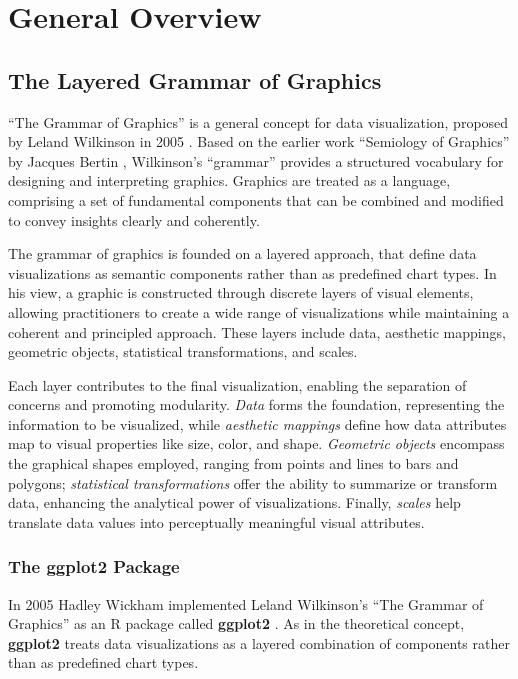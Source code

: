 \documentclass[
]{krantz}
\begin{document}
\hypertarget{part-general-overview}{%
\part{General Overview}\label{part-general-overview}}

\hypertarget{grammar}{%
\chapter{The Layered Grammar of Graphics}\label{grammar}}

``The Grammar of Graphics'' is a general concept for data visualization, proposed by Leland Wilkinson in 2005 \citep{wilkinson2005}. Based on the earlier work ``Semiology of Graphics'' by Jacques Bertin \citep{bertin1983}, Wilkinson's ``grammar'' provides a structured vocabulary for designing and interpreting graphics. Graphics are treated as a language, comprising a set of fundamental components that can be combined and modified to convey insights clearly and coherently.

The grammar of graphics is founded on a layered approach, that define data visualizations as semantic components rather than as predefined chart types. In his view, a graphic is constructed through discrete layers of visual elements, allowing practitioners to create a wide range of visualizations while maintaining a coherent and principled approach. These layers include data, aesthetic mappings, geometric objects, statistical transformations, and scales.

Each layer contributes to the final visualization, enabling the separation of concerns and promoting modularity. \emph{Data} forms the foundation, representing the information to be visualized, while \emph{aesthetic mappings} define how data attributes map to visual properties like size, color, and shape. \emph{Geometric objects} encompass the graphical shapes employed, ranging from points and lines to bars and polygons; \emph{statistical transformations} offer the ability to summarize or transform data, enhancing the analytical power of visualizations. Finally, \emph{scales} help translate data values into perceptually meaningful visual attributes.

\hypertarget{ggplot}{%
\section{The ggplot2 Package}\label{ggplot}}

In 2005 Hadley Wickham implemented Leland Wilkinson's ``The Grammar of Graphics'' as an R package called \textbf{ggplot2} \citep{ggplot2}. As in the theoretical concept, \textbf{ggplot2} treats data visualizations as a layered combination of components rather than as predefined chart types.
\end{document}
